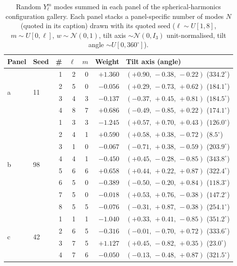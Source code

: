 \begin{table}
\centering
\caption{Random $Y_\ell^m$ modes summed in each panel of the spherical-harmonics configuration gallery. Each panel stacks a panel-specific number of modes $N$ (quoted in its caption) drawn with its quoted seed ($\ell\sim U[1,8]$, $m\sim U[0,\ell]$, $w\sim\mathcal{N}(0,1)$, tilt axis $\sim\mathcal{N}(0,I_3)$ unit-normalised, tilt angle $\sim U[0,360^\circ]$).}
\label{tab:spherical_harmonics_random_stacks}
\begin{tabular}{@{}llrrrrl@{}}
\toprule
Panel & Seed & \# & $\ell$ & $m$ & Weight & Tilt axis (angle) \\
\midrule
\multirow{4}{*}{a} & \multirow{4}{*}{11} & 1 & 2 & 0 & $+1.360$ & $(+0.90,\,-0.38,\,-0.22)$ ($334.2^\circ$) \\
 &  & 2 & 5 & 0 & $-0.056$ & $(+0.29,\,-0.73,\,+0.62)$ ($184.1^\circ$) \\
 &  & 3 & 4 & 3 & $-0.137$ & $(-0.37,\,+0.45,\,+0.81)$ ($184.5^\circ$) \\
 &  & 4 & 8 & 7 & $+0.686$ & $(-0.49,\,-0.85,\,+0.22)$ ($174.1^\circ$) \\
\midrule
\multirow{8}{*}{b} & \multirow{8}{*}{98} & 1 & 3 & 3 & $-1.245$ & $(+0.57,\,+0.70,\,+0.43)$ ($126.0^\circ$) \\
 &  & 2 & 4 & 1 & $+0.590$ & $(+0.58,\,+0.38,\,-0.72)$ ($8.5^\circ$) \\
 &  & 3 & 1 & 0 & $-0.067$ & $(-0.71,\,+0.38,\,-0.59)$ ($203.9^\circ$) \\
 &  & 4 & 4 & 1 & $-0.450$ & $(+0.45,\,-0.28,\,-0.85)$ ($343.8^\circ$) \\
 &  & 5 & 6 & 6 & $+0.658$ & $(+0.44,\,+0.22,\,+0.87)$ ($322.4^\circ$) \\
 &  & 6 & 5 & 0 & $-0.389$ & $(-0.50,\,-0.20,\,+0.84)$ ($118.3^\circ$) \\
 &  & 7 & 5 & 0 & $-0.018$ & $(+0.53,\,+0.76,\,-0.38)$ ($147.2^\circ$) \\
 &  & 8 & 5 & 5 & $-0.076$ & $(-0.31,\,+0.87,\,-0.38)$ ($254.1^\circ$) \\
\midrule
\multirow{16}{*}{c} & \multirow{16}{*}{42} & 1 & 1 & 1 & $-1.040$ & $(+0.33,\,+0.41,\,-0.85)$ ($351.2^\circ$) \\
 &  & 2 & 6 & 5 & $-0.316$ & $(-0.01,\,-0.70,\,+0.72)$ ($333.6^\circ$) \\
 &  & 3 & 7 & 5 & $+1.127$ & $(+0.45,\,-0.82,\,+0.35)$ ($23.0^\circ$) \\
 &  & 4 & 7 & 6 & $-0.050$ & $(-0.13,\,-0.48,\,+0.87)$ ($321.5^\circ$) \\

\end{tabular}
\end{table}
